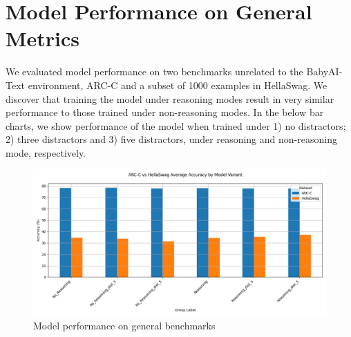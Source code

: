 \documentclass[11pt,a4paper]{article}
\begin{document}
\newpage
\section{Model Performance on General Metrics}
\label{app:Z}
We evaluated model performance on two benchmarks unrelated to the BabyAI-Text environment, ARC-C and a subset of 1000 examples in HellaSwag. We discover that training the model under reasoning modes result in very similar performance to those trained under non-reasoning modes. In the below bar charts, we show performance of the model when trained under 1) no distractors; 2) three distractors and 3) five distractors, under reasoning and non-reasoning mode, respectively.

\begin{figure}[H]
    \centering
    \includegraphics[width=1\linewidth]
    {../images/general_benchmark_plot.png}
    \caption{Model performance on general benchmarks}
\end{figure}

\newpage
\end{document}
